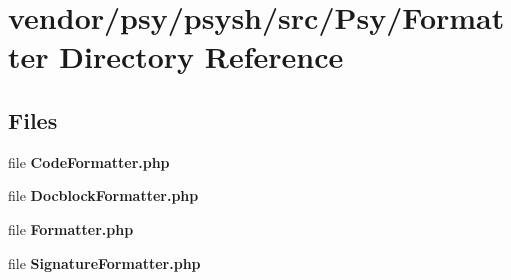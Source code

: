 \section{vendor/psy/psysh/src/\+Psy/\+Formatter Directory Reference}
\label{dir_b7517bfb2c5109158980d798bc4f4573}
\subsection*{Files}
\begin{DoxyCompactItemize}
\item 
file {\bf Code\+Formatter.\+php}
\item 
file {\bf Docblock\+Formatter.\+php}
\item 
file {\bf Formatter.\+php}
\item 
file {\bf Signature\+Formatter.\+php}
\end{DoxyCompactItemize}
